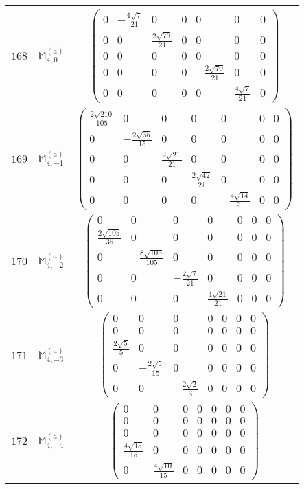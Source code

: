 \documentclass[fleqn,8pt,landscape]{jsarticle}
\begin{document}
\begin{center}
\begin{longtable}{ccc}
$ 168 $ & $ \mathbb{M}_{4,0}^{(a)} $ & $ \begin{pmatrix} 0 & - \frac{4 \sqrt{7}}{21} & 0 & 0 & 0 & 0 & 0 \\ 0 & 0 & \frac{2 \sqrt{70}}{21} & 0 & 0 & 0 & 0 \\ 0 & 0 & 0 & 0 & 0 & 0 & 0 \\ 0 & 0 & 0 & 0 & - \frac{2 \sqrt{70}}{21} & 0 & 0 \\ 0 & 0 & 0 & 0 & 0 & \frac{4 \sqrt{7}}{21} & 0 \end{pmatrix} $ \\ \hline
$ 169 $ & $ \mathbb{M}_{4,-1}^{(a)} $ & $ \begin{pmatrix} \frac{2 \sqrt{210}}{105} & 0 & 0 & 0 & 0 & 0 & 0 \\ 0 & - \frac{2 \sqrt{35}}{15} & 0 & 0 & 0 & 0 & 0 \\ 0 & 0 & \frac{2 \sqrt{21}}{21} & 0 & 0 & 0 & 0 \\ 0 & 0 & 0 & \frac{2 \sqrt{42}}{21} & 0 & 0 & 0 \\ 0 & 0 & 0 & 0 & - \frac{4 \sqrt{14}}{21} & 0 & 0 \end{pmatrix} $ \\ \hline
$ 170 $ & $ \mathbb{M}_{4,-2}^{(a)} $ & $ \begin{pmatrix} 0 & 0 & 0 & 0 & 0 & 0 & 0 \\ \frac{2 \sqrt{105}}{35} & 0 & 0 & 0 & 0 & 0 & 0 \\ 0 & - \frac{8 \sqrt{105}}{105} & 0 & 0 & 0 & 0 & 0 \\ 0 & 0 & - \frac{2 \sqrt{7}}{21} & 0 & 0 & 0 & 0 \\ 0 & 0 & 0 & \frac{4 \sqrt{21}}{21} & 0 & 0 & 0 \end{pmatrix} $ \\ \hline
$ 171 $ & $ \mathbb{M}_{4,-3}^{(a)} $ & $ \begin{pmatrix} 0 & 0 & 0 & 0 & 0 & 0 & 0 \\ 0 & 0 & 0 & 0 & 0 & 0 & 0 \\ \frac{2 \sqrt{5}}{5} & 0 & 0 & 0 & 0 & 0 & 0 \\ 0 & - \frac{2 \sqrt{5}}{15} & 0 & 0 & 0 & 0 & 0 \\ 0 & 0 & - \frac{2 \sqrt{2}}{3} & 0 & 0 & 0 & 0 \end{pmatrix} $ \\ \hline
$ 172 $ & $ \mathbb{M}_{4,-4}^{(a)} $ & $ \begin{pmatrix} 0 & 0 & 0 & 0 & 0 & 0 & 0 \\ 0 & 0 & 0 & 0 & 0 & 0 & 0 \\ 0 & 0 & 0 & 0 & 0 & 0 & 0 \\ \frac{4 \sqrt{15}}{15} & 0 & 0 & 0 & 0 & 0 & 0 \\ 0 & \frac{4 \sqrt{10}}{15} & 0 & 0 & 0 & 0 & 0 \end{pmatrix} $ \\ \hline

\end{longtable}
\end{center}
\end{document}

